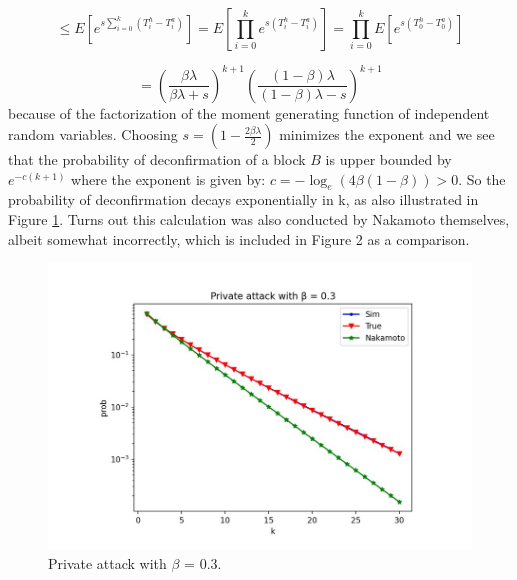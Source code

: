 \documentclass{report}
\begin{document}
\begin{equation}
	\leq E[e^{s\sum_{i=0}^{k}(T_{i}^{h} - T_{i}^{a})}] = E[\prod_{i=0}^{k}e^{s(T_{i}^{h} - T_{i}^{a})}] = \prod_{i=0}^{k}E[e^{s(T_{0}^{h} - T_{0}^{a})}]
\end{equation}

\begin{equation}
	 = (\frac{\beta\lambda}{\beta \lambda + s})^{k + 1} (\frac{(1 - \beta) \lambda}{(1 - \beta) \lambda - s})^{k + 1}
\end{equation}
because of the factorization of the moment generating function of independent random variables. Choosing $s = (1 - \frac{2\beta\lambda}{2})$ minimizes the exponent and we see that the probability of deconfirmation of a block $B$ is upper bounded by $e^{ - c(k+1)}$ where the exponent is given by:
$c = - \log_{e}(4\beta(1 - \beta)) > 0.$
So the probability of deconfirmation decays exponentially in k, as also illustrated in Figure \ref{fig:f2}. Turns out this calculation was also conducted by Nakamoto themselves, albeit somewhat incorrectly, which is included in Figure 2 as a comparison.
\begin{figure}[h!]
	\centering
	\includegraphics[width=0.6\linewidth]{Fig/F2}
	\caption{Private attack with $\beta$ = 0.3.}
	\label{fig:f2}
\end{figure}
\end{document}
